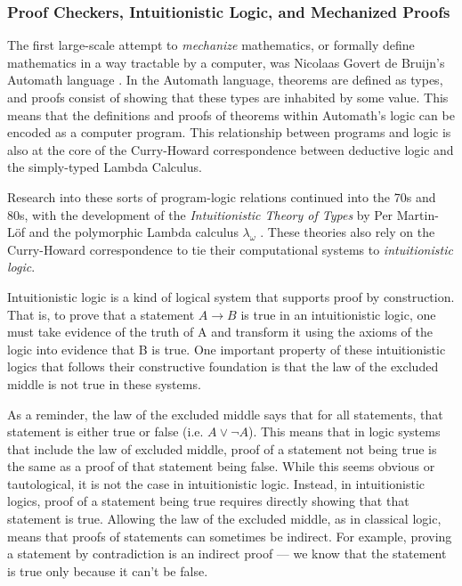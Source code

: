 \subsubsection{Proof Checkers, Intuitionistic Logic, and Mechanized Proofs}
The first large-scale attempt to \textit{mechanize} mathematics, or formally define mathematics in a way tractable by a computer, was Nicolaas Govert de Bruijn's Automath language \cite{x}. In the Automath language, theorems are defined as types, and proofs consist of showing that these types are inhabited by some value. This means that the definitions and proofs of theorems within Automath's logic can be encoded as a computer program. This relationship between programs and logic is also at the core of the Curry-Howard correspondence between deductive logic and the simply-typed Lambda Calculus.

Research into these sorts of program-logic relations continued into the 70s and 80s, with the development of the \textit{Intuitionistic Theory of Types} \cite{x} by Per Martin-Löf and the polymorphic Lambda calculus $\lambda_\omega$ \cite{x}. These theories also rely on the Curry-Howard correspondence to tie their computational systems to \textit{intuitionistic logic}. 

Intuitionistic logic is a kind of logical system that supports proof by construction. That is, to prove that a statement $A \xrightarrow{} B$ is true in an intuitionistic logic, one must take evidence of the truth of A and transform it using the axioms of the logic into evidence that B is true. One important property of these intuitionistic logics that follows their constructive foundation is that the law of the excluded middle is not true in these systems. 

As a reminder, the law of the excluded middle says that for all statements, that statement is either true or false (i.e. $A \lor \neg A$). This means that in logic systems that include the law of excluded middle, proof of a statement not being true is the same as a proof of that statement being false. While this seems obvious or tautological, it is not the case in intuitionistic logic. Instead, in intuitionistic logics, proof of a statement being true requires directly showing that that statement is true. Allowing the law of the excluded middle, as in classical logic, means that proofs of statements can sometimes be indirect. For example, proving a statement by contradiction is an indirect proof --- we know that the statement is true only because it can't be false. 

